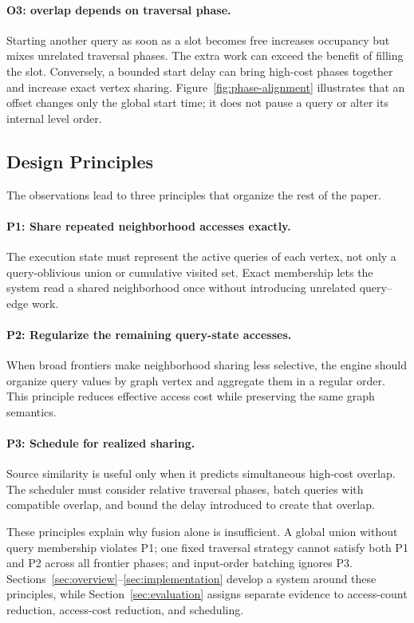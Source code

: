 \paragraph{O3: overlap depends on traversal phase.}
Starting another query as soon as a slot becomes free increases occupancy but mixes unrelated traversal phases.  The extra work can exceed the benefit of filling the slot.  Conversely, a bounded start delay can bring high-cost phases together and increase exact vertex sharing.  Figure~\ref{fig:phase-alignment} illustrates that an offset changes only the global start time; it does not pause a query or alter its internal level order.



\subsection{Design Principles}

The observations lead to three principles that organize the rest of the paper.

\paragraph{P1: Share repeated neighborhood accesses exactly.}
The execution state must represent the active queries of each vertex, not only a query-oblivious union or cumulative visited set.  Exact membership lets the system read a shared neighborhood once without introducing unrelated query--edge work.

\paragraph{P2: Regularize the remaining query-state accesses.}
When broad frontiers make neighborhood sharing less selective, the engine should organize query values by graph vertex and aggregate them in a regular order.  This principle reduces effective access cost while preserving the same graph semantics.

\paragraph{P3: Schedule for realized sharing.}
Source similarity is useful only when it predicts simultaneous high-cost overlap.  The scheduler must consider relative traversal phases, batch queries with compatible overlap, and bound the delay introduced to create that overlap.

These principles explain why fusion alone is insufficient.  A global union without query membership violates P1; one fixed traversal strategy cannot satisfy both P1 and P2 across all frontier phases; and input-order batching ignores P3.  Sections~\ref{sec:overview}--\ref{sec:implementation} develop a system around these principles, while Section~\ref{sec:evaluation} assigns separate evidence to access-count reduction, access-cost reduction, and scheduling.
